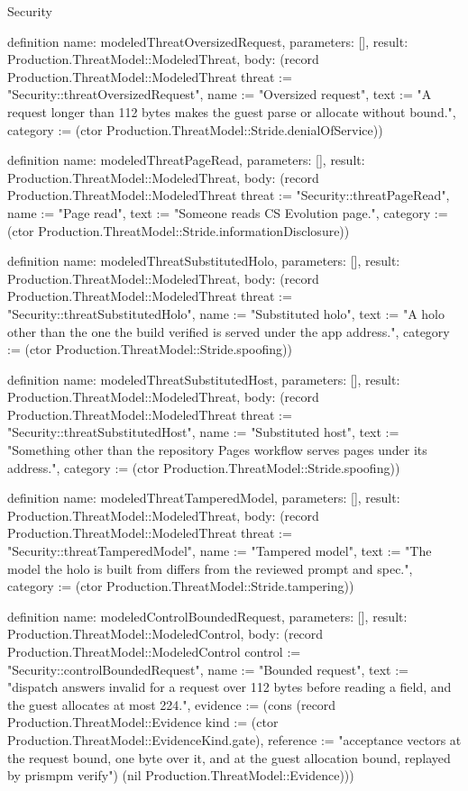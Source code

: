 \begin{lexlean}{Security}
\begin{semanticmodule}
definition{
  name: modeledThreatOversizedRequest,
  parameters: [],
  result: Production.ThreatModel::ModeledThreat,
  body: (record Production.ThreatModel::ModeledThreat {threat := "Security::threatOversizedRequest", name := "Oversized request", text := "A request longer than 112 bytes makes the guest parse or allocate without bound.", category := (ctor Production.ThreatModel::Stride.denialOfService)})
}

definition{
  name: modeledThreatPageRead,
  parameters: [],
  result: Production.ThreatModel::ModeledThreat,
  body: (record Production.ThreatModel::ModeledThreat {threat := "Security::threatPageRead", name := "Page read", text := "Someone reads CS Evolution page.", category := (ctor Production.ThreatModel::Stride.informationDisclosure)})
}

definition{
  name: modeledThreatSubstitutedHolo,
  parameters: [],
  result: Production.ThreatModel::ModeledThreat,
  body: (record Production.ThreatModel::ModeledThreat {threat := "Security::threatSubstitutedHolo", name := "Substituted holo", text := "A holo other than the one the build verified is served under the app address.", category := (ctor Production.ThreatModel::Stride.spoofing)})
}

definition{
  name: modeledThreatSubstitutedHost,
  parameters: [],
  result: Production.ThreatModel::ModeledThreat,
  body: (record Production.ThreatModel::ModeledThreat {threat := "Security::threatSubstitutedHost", name := "Substituted host", text := "Something other than the repository Pages workflow serves pages under its address.", category := (ctor Production.ThreatModel::Stride.spoofing)})
}

definition{
  name: modeledThreatTamperedModel,
  parameters: [],
  result: Production.ThreatModel::ModeledThreat,
  body: (record Production.ThreatModel::ModeledThreat {threat := "Security::threatTamperedModel", name := "Tampered model", text := "The model the holo is built from differs from the reviewed prompt and spec.", category := (ctor Production.ThreatModel::Stride.tampering)})
}

definition{
  name: modeledControlBoundedRequest,
  parameters: [],
  result: Production.ThreatModel::ModeledControl,
  body: (record Production.ThreatModel::ModeledControl {control := "Security::controlBoundedRequest", name := "Bounded request", text := "dispatch answers invalid for a request over 112 bytes before reading a field, and the guest allocates at most 224.", evidence := (cons (record Production.ThreatModel::Evidence {kind := (ctor Production.ThreatModel::EvidenceKind.gate), reference := "acceptance vectors at the request bound, one byte over it, and at the guest allocation bound, replayed by prismpm verify"}) (nil Production.ThreatModel::Evidence))})
}


\end{semanticmodule}
\end{lexlean}
